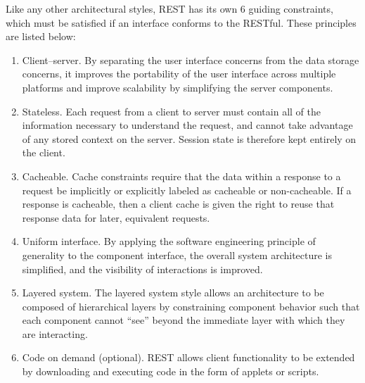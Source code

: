 Like any other architectural styles, REST has its own 6 guiding constraints, which must be satisfied if an interface conforms to the RESTful. These principles are listed below:
\begin{enumerate}
  \item Client–server. By separating the user interface concerns from the data storage concerns, it improves the portability of the user interface across multiple platforms and improve scalability by simplifying the server components.
  \item Stateless. Each request from a client to server must contain all of the information necessary to understand the request, and cannot take advantage of any stored context on the server. Session state is therefore kept entirely on the client.
  \item Cacheable. Cache constraints require that the data within a response to a request be implicitly or explicitly labeled as cacheable or non-cacheable. If a response is cacheable, then a client cache is given the right to reuse that response data for later, equivalent requests.
  \item Uniform interface. By applying the software engineering principle of generality to the component interface, the overall system architecture is simplified, and the visibility of interactions is improved.
  \item Layered system. The layered system style allows an architecture to be composed of hierarchical layers by constraining component behavior such that each component cannot ``see'' beyond the immediate layer with which they are interacting.
  \item Code on demand (optional). REST allows client functionality to be extended by downloading and executing code in the form of applets or scripts.
\end{enumerate}

